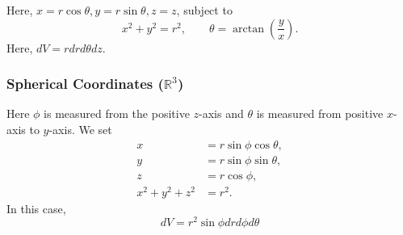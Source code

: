 \begin{example}[$\R^3$]
Here, $x = r \cos \theta, y = r \sin \theta, z = z$, subject to
\[
x^2 + y^ 2= r^2, \qquad \theta = \arctan \left(\frac{y}{x}\right).
\]
Here, $dV = rdr d\theta dz$.
\end{example}

\subsubsection{Spherical Coordinates ($\mathbb R^3$)}

Here $\phi$ is measured from the positive $z$-axis and $\theta$ is measured from 
positive $x$-axis to $y$-axis. We set
\[
\begin{aligned}
x &= r\sin\phi\cos\theta,\\
y &= r\sin\phi\sin\theta,\\
z &= r\cos\phi,\\
x^2+y^2+z^2 &= r^2.
\end{aligned}
\]
In this case,
\[
dV=r^2\sin\phi
dr d\phi d\theta
\]